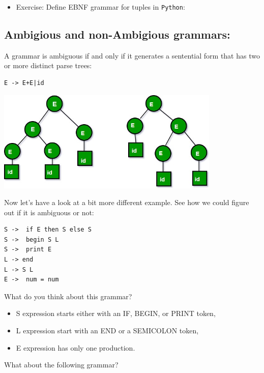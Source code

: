 \documentclass[11pt]{article}
\begin{document}
\begin{itemize}
\item Exercise: Define  EBNF grammar for tuples in \texttt{Python}:
\end{itemize}


\subsection{Ambigious and non-Ambigious grammars:}
\label{sec:orgb65d176}


A grammar is ambiguous if and only if it generates a sentential form that has
two or more distinct parse trees:

\begin{verbatim}
E -> E+E|id
\end{verbatim}

\begin{center}
\includegraphics[width=0.8\textwidth]{./figures/grammertree2.jpeg}
\label{fig5}
\end{center}


Now let's have a look at a bit more different example. See how we could figure
out if it is ambiguous or not:

\begin{verbatim}
S ->  if E then S else S
S ->  begin S L
S ->  print E
L -> end
L -> S L
E ->  num = num
\end{verbatim}

What do you think about this grammar?

\begin{itemize}
\item S expression starts either with an IF, BEGIN, or PRINT token,

\item L expression start with an END or a SEMICOLON token,

\item E expression has only one production.
\end{itemize}

What about the following grammar?
\end{document}
